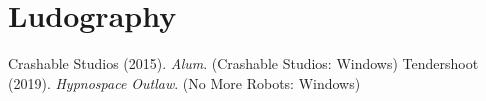 \section{Ludography}
Crashable Studios (2015). \textit{Alum}. (Crashable Studios: Windows)
Tendershoot (2019). \textit{Hypnospace Outlaw}. (No More Robots: Windows)